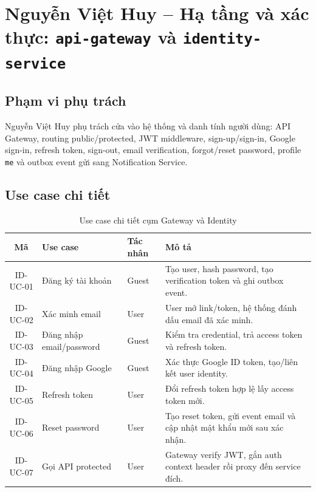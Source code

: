 \documentclass[14pt,a4paper,oneside]{extreport}
\begin{document}
\section{Nguyễn Việt Huy -- Hạ tầng và xác thực: \texttt{api-gateway} và \texttt{identity-service}}
\label{sec:phase3-identity-gateway}

\subsection{Phạm vi phụ trách}

Nguyễn Việt Huy phụ trách cửa vào hệ thống và danh tính người dùng: API Gateway, routing public/protected, JWT middleware, sign-up/sign-in, Google sign-in, refresh token, sign-out, email verification, forgot/reset password, profile \texttt{me} và outbox event gửi sang Notification Service.

\subsection{Use case chi tiết}

\begin{table}[H]
\centering
\caption{Use case chi tiết cụm Gateway và Identity}
\label{tab:uc-identity-gateway}
\renewcommand{\arraystretch}{1.3}
\small
\begin{tabularx}{\textwidth}{|c|l|l|X|}
\hline
\textbf{Mã} & \textbf{Use case} & \textbf{Tác nhân} & \textbf{Mô tả} \\
\hline
ID-UC-01 & Đăng ký tài khoản & Guest & Tạo user, hash password, tạo verification token và ghi outbox event. \\
\hline
ID-UC-02 & Xác minh email & User & User mở link/token, hệ thống đánh dấu email đã xác minh. \\
\hline
ID-UC-03 & Đăng nhập email/password & Guest & Kiểm tra credential, trả access token và refresh token. \\
\hline
ID-UC-04 & Đăng nhập Google & Guest & Xác thực Google ID token, tạo/liên kết user identity. \\
\hline
ID-UC-05 & Refresh token & User & Đổi refresh token hợp lệ lấy access token mới. \\
\hline
ID-UC-06 & Reset password & User & Tạo reset token, gửi event email và cập nhật mật khẩu mới sau xác nhận. \\
\hline
ID-UC-07 & Gọi API protected & User & Gateway verify JWT, gắn auth context header rồi proxy đến service đích. \\
\hline
\end{tabularx}
\end{table}
\end{document}
